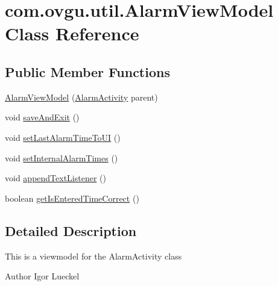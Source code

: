 \hypertarget{classcom_1_1ovgu_1_1util_1_1_alarm_view_model}{\section{com.\-ovgu.\-util.\-Alarm\-View\-Model Class Reference}
\label{classcom_1_1ovgu_1_1util_1_1_alarm_view_model}
}
\subsection*{Public Member Functions}
\begin{DoxyCompactItemize}
\item 
\hyperlink{classcom_1_1ovgu_1_1util_1_1_alarm_view_model_aafa25a37ae679b8963157775c1c95cf8}{Alarm\-View\-Model} (\hyperlink{classcom_1_1ovgu_1_1zim_1_1_alarm_activity}{Alarm\-Activity} parent)
\item 
void \hyperlink{classcom_1_1ovgu_1_1util_1_1_alarm_view_model_a00d0e2a30aae9130e9392df06cfe9da6}{save\-And\-Exit} ()
\item 
void \hyperlink{classcom_1_1ovgu_1_1util_1_1_alarm_view_model_a3ef352e4d73883dde2bfd60e6a2030e0}{set\-Last\-Alarm\-Time\-To\-U\-I} ()
\item 
void \hyperlink{classcom_1_1ovgu_1_1util_1_1_alarm_view_model_a56c229b0bb8c40a6466274099f828308}{set\-Internal\-Alarm\-Times} ()
\item 
void \hyperlink{classcom_1_1ovgu_1_1util_1_1_alarm_view_model_a6e7bbb9242342ebea411f7c80de3c617}{append\-Text\-Listener} ()
\item 
boolean \hyperlink{classcom_1_1ovgu_1_1util_1_1_alarm_view_model_af6aea61ec09aca02e8552d80ee786892}{get\-Is\-Entered\-Time\-Correct} ()
\end{DoxyCompactItemize}


\subsection{Detailed Description}
This is a viewmodel for the Alarm\-Activity class \begin{DoxyAuthor}{Author}
Igor Lueckel 
\end{DoxyAuthor}


